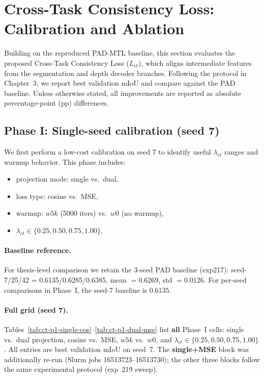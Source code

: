 \section{Cross-Task Consistency Loss: Calibration and Ablation}
\label{sec:ct-calibration-ablation}

Building on the reproduced PAD-MTL baseline, this section evaluates the proposed Cross-Task Consistency Loss ($L_{ct}$), which aligns intermediate features from the segmentation and depth decoder branches. Following the protocol in Chapter~3, we report best validation mIoU and compare against the PAD baseline. Unless otherwise stated, all improvements are reported as absolute percentage-point (pp) differences.

\subsection{Phase I: Single-seed calibration (seed 7)}
\label{subsec:ct-phase1-seed7}

We first perform a low-cost calibration on seed 7 to identify useful $\lambda_{ct}$ ranges and warmup behavior. This phase includes:
\begin{itemize}
\item projection mode: single vs.\ dual,
\item loss type: cosine vs.\ MSE,
\item warmup: $w5k$ (5000 iters) vs.\ $w0$ (no warmup),
\item $\lambda_{ct}\in\{0.25,0.50,0.75,1.00\}$.
\end{itemize}

\paragraph{Baseline reference.}
For thesis-level comparison we retain the 3-seed PAD baseline (exp217): seed-7/25/42 = 0.6135/0.6285/0.6385, mean $=0.6269$, std $=0.0126$. For per-seed comparisons in Phase~I, the seed-7 baseline is $0.6135$.

\paragraph{Full grid (seed 7).}
Tables~\ref{tab:ct-p1-single-cos}--\ref{tab:ct-p1-dual-mse} list \textbf{all} Phase~I cells: single vs.\ dual projection, cosine vs.\ MSE, $w5k$ vs.\ $w0$, and $\lambda_{ct}\in\{0.25,0.50,0.75,1.00\}$. All entries are best validation mIoU on seed~7. The \textbf{single+MSE} block was additionally re-run (Slurm jobs 16513723--16513730); the other three blocks follow the same experimental protocol (exp~219 sweep).

